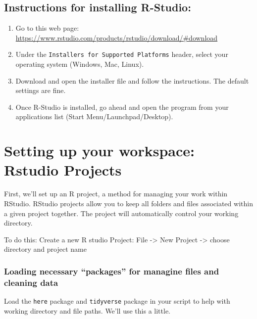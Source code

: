 \documentclass[
]{book}
\providecommand{\tightlist}{%
  \setlength{\itemsep}{0pt}\setlength{\parskip}{0pt}}
\begin{document}
\hypertarget{instructions-for-installing-r-studio}{%
\section{Instructions for installing R-Studio:}\label{instructions-for-installing-r-studio}}

\begin{enumerate}
\def\labelenumi{\arabic{enumi}.}
\tightlist
\item
  Go to this web page: \url{https://www.rstudio.com/products/rstudio/download/\#download}
\item
  Under the \texttt{Installers\ for\ Supported\ Platforms} header, select your operating system (Windows, Mac, Linux).
\item
  Download and open the installer file and follow the instructions. The default settings are fine.
\item
  Once R-Studio is installed, go ahead and open the program from your applications list (Start Menu/Launchpad/Desktop).
\end{enumerate}

\hypertarget{setting-up-your-workspace-rstudio-projects}{%
\chapter{Setting up your workspace: Rstudio Projects}\label{setting-up-your-workspace-rstudio-projects}}

First, we'll set up an R project, a method for managing your work within RStudio. RStudio projects allow you to keep all folders and files associated within a given project together. The project will automatically control your working directory.

To do this:
Create a new R studio Project: File -\textgreater{} New Project -\textgreater{} choose directory and project name

\hypertarget{loading-necessary-packages-for-managine-files-and-cleaning-data}{%
\subsection{Loading necessary ``packages'' for managine files and cleaning data}\label{loading-necessary-packages-for-managine-files-and-cleaning-data}}

Load the \texttt{here} package and \texttt{tidyverse} package in your script to help with working directory and file paths. We'll use this a little.
\end{document}
